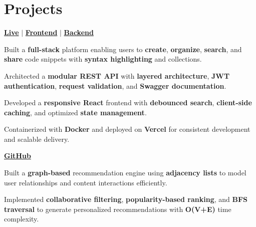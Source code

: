 \documentclass[]{deedy-resume-openfont}
\begin{document}
\begin{minipage}[t]{0.66\textwidth}

\section{Projects}
\href{https://snippetvault-v1.vercel.app/}{\bf Live}
\;$|$\; \href{https://github.com/deeplukhi/Snippet-Manager-Frontend}{\bf Frontend}
\;$|$\; \href{https://github.com/deeplukhi/Snippet-Manager-Backend}{\bf Backend}
\vspace{\topsep}
\begin{tightemize}
  \item Built a \textbf{full-stack} platform enabling users to \textbf{create}, \textbf{organize}, \textbf{search}, and \textbf{share} code snippets with \textbf{syntax highlighting} and collections.
  \item Architected a \textbf{modular REST API} with \textbf{layered architecture}, \textbf{JWT authentication}, \textbf{request validation}, and \textbf{Swagger documentation}.
  \item Developed a \textbf{responsive React} frontend with \textbf{debounced search}, \textbf{client-side caching}, and optimized \textbf{state management}.
  \item Containerized with \textbf{Docker} and deployed on \textbf{Vercel} for consistent development and scalable delivery.
\end{tightemize}
\sectionsep

\href{https://github.com/deeplukhi/Social-Recommendation-Engine}{\bf GitHub}
\vspace{\topsep}
\begin{tightemize}
  \item Built a \textbf{graph-based} recommendation engine using \textbf{adjacency lists} to model user relationships and content interactions efficiently.
  \item Implemented \textbf{collaborative filtering}, \textbf{popularity-based ranking}, and \textbf{BFS traversal} to generate personalized recommendations with \textbf{O(V+E)} time complexity.
\end{tightemize}

\end{minipage}
\end{document}
